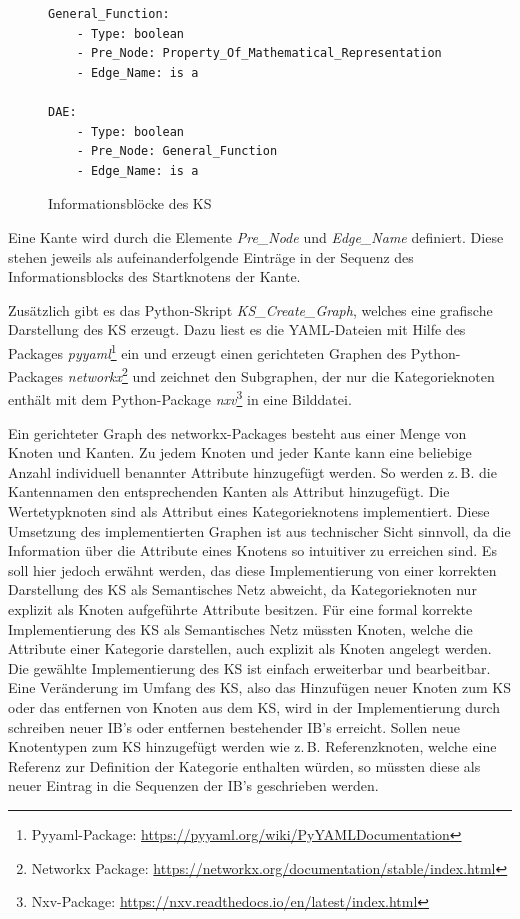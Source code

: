 \begin{figure}[b]
	\centering
	\begin{adjustbox}{padding=15pt 0pt 0pt 0pt, fbox}
	\begin{lstlisting}[basicstyle=\footnotesize]
General_Function:
	- Type: boolean
	- Pre_Node: Property_Of_Mathematical_Representation
	- Edge_Name: is a

DAE: 
	- Type: boolean
	- Pre_Node: General_Function
	- Edge_Name: is a
	\end{lstlisting}
	\end{adjustbox}
	\caption{Informationsblöcke des KS}
	\label{fig:IBs}
\end{figure}

Eine Kante wird durch die Elemente \textit{Pre\_Node} und \textit{Edge\_Name} definiert. Diese stehen jeweils als aufeinanderfolgende Einträge in der Sequenz des Informationsblocks des Startknotens der Kante.

Zusätzlich gibt es das Python-Skript \textit{KS\_Create\_Graph}, welches eine grafische Darstellung des KS erzeugt. Dazu liest es die YAML-Dateien mit Hilfe des Packages \textit{pyyaml}\footnote{Pyyaml-Package: \url{https://pyyaml.org/wiki/PyYAMLDocumentation}} ein und erzeugt einen gerichteten Graphen des Python-Packages \textit{networkx}\footnote{Networkx Package: \url{https://networkx.org/documentation/stable/index.html}} und zeichnet den Subgraphen, der nur die Kategorieknoten enthält mit dem Python-Package \textit{nxv}\footnote{Nxv-Package: \url{https://nxv.readthedocs.io/en/latest/index.html}} in eine Bilddatei.

Ein gerichteter Graph des networkx-Packages besteht aus einer Menge von Knoten und Kanten. Zu jedem Knoten und jeder Kante kann eine beliebige Anzahl individuell benannter Attribute hinzugefügt werden. So werden z.\,B. die Kantennamen den entsprechenden Kanten als Attribut hinzugefügt. Die Wertetypknoten sind als Attribut eines Kategorieknotens implementiert. Diese Umsetzung des implementierten Graphen ist aus technischer Sicht sinnvoll, da die Information über die Attribute eines Knotens so intuitiver zu erreichen sind. Es soll hier jedoch erwähnt werden, das diese Implementierung von einer korrekten Darstellung des KS als Semantisches Netz abweicht, da Kategorieknoten nur explizit als Knoten aufgeführte Attribute besitzen. Für eine formal korrekte Implementierung des KS als Semantisches Netz müssten Knoten, welche die Attribute einer Kategorie darstellen, auch explizit als Knoten angelegt werden.\\
Die gewählte Implementierung des KS ist einfach erweiterbar und bearbeitbar. Eine Veränderung im Umfang des KS, also das Hinzufügen neuer Knoten zum KS oder das entfernen von Knoten aus dem KS, wird in der Implementierung durch schreiben neuer IB\textquoteright s oder entfernen bestehender IB\textquoteright s erreicht. Sollen neue Knotentypen zum KS hinzugefügt werden wie z.\,B. Referenzknoten, welche eine Referenz zur Definition der Kategorie enthalten würden, so müssten diese als neuer Eintrag in die Sequenzen der IB\textquoteright s geschrieben werden.

